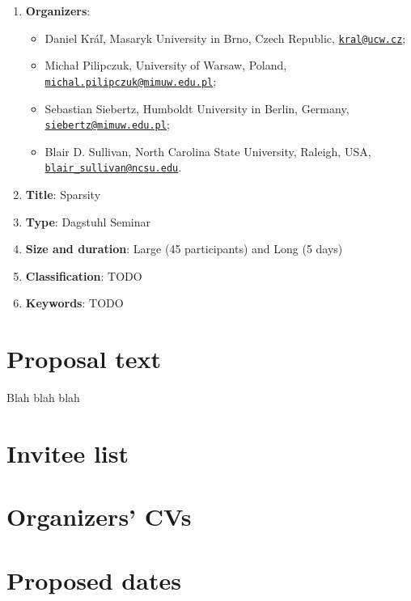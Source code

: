 \documentclass[10pt]{article}
\newcommand{\ourtitle}{Sparsity}
\newcommand{\email}[1]{\href{mailto:#1}{\nolinkurl{#1}}}
\begin{document}
\begin{enumerate}
\item {\bf{Organizers}}:
\begin{itemize}
\item Daniel Kr\'a\v{l}, Masaryk University in Brno, Czech Republic, \email{kral@ucw.cz};
\item Micha\l{} Pilipczuk, University of Warsaw, Poland, \email{michal.pilipczuk@mimuw.edu.pl};
\item Sebastian Siebertz, Humboldt University in Berlin, Germany, \email{siebertz@mimuw.edu.pl};
\item Blair D. Sullivan, North Carolina State University, Raleigh, USA, \email{blair_sullivan@ncsu.edu}.
\end{itemize}
\item {\bf{Title}}: \ourtitle
\item {\bf{Type}}: Dagstuhl Seminar
\item {\bf{Size and duration}}: Large (45 participants) and Long (5 days)
\item {\bf{Classification}}: TODO
\item {\bf{Keywords}}: TODO
\end{enumerate}

\section{Proposal text}

Blah blah blah~\cite{sparsity}










\section{Invitee list}



\section{Organizers' CVs}

\section{Proposed dates}





\end{document}
